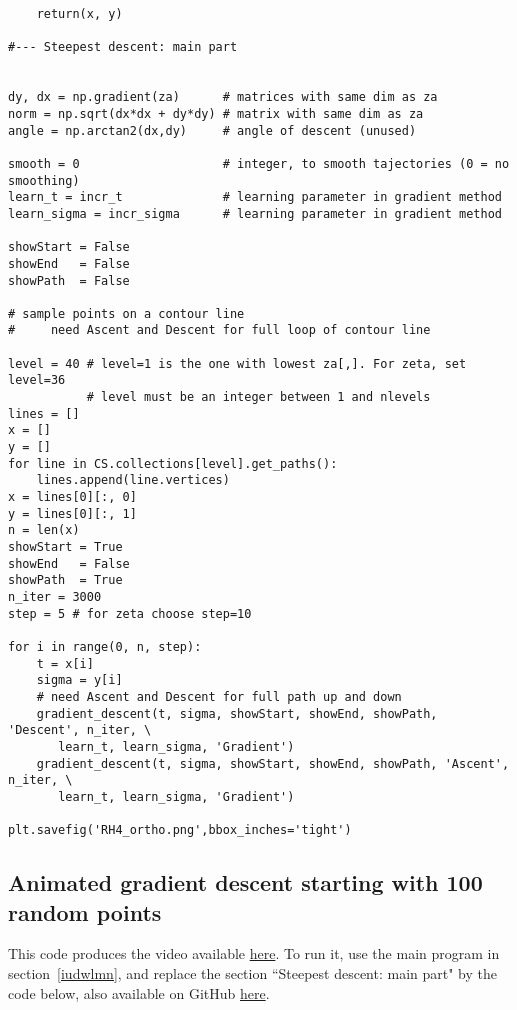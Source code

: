 \documentclass[oneside,10pt]{book}
\begin{document}
\begin{lstlisting}
    return(x, y)  

#--- Steepest descent: main part 


dy, dx = np.gradient(za)      # matrices with same dim as za 
norm = np.sqrt(dx*dx + dy*dy) # matrix with same dim as za
angle = np.arctan2(dx,dy)     # angle of descent (unused)

smooth = 0                    # integer, to smooth tajectories (0 = no smoothing)
learn_t = incr_t              # learning parameter in gradient method  
learn_sigma = incr_sigma      # learning parameter in gradient method 

showStart = False
showEnd   = False
showPath  = False

# sample points on a contour line
#     need Ascent and Descent for full loop of contour line

level = 40 # level=1 is the one with lowest za[,]. For zeta, set level=36 
           # level must be an integer between 1 and nlevels
lines = []  
x = []
y = []
for line in CS.collections[level].get_paths():
    lines.append(line.vertices)
x = lines[0][:, 0]
y = lines[0][:, 1]
n = len(x)
showStart = True
showEnd   = False
showPath  = True
n_iter = 3000 
step = 5 # for zeta choose step=10

for i in range(0, n, step):  
    t = x[i]
    sigma = y[i]
    # need Ascent and Descent for full path up and down
    gradient_descent(t, sigma, showStart, showEnd, showPath, 'Descent', n_iter, \
       learn_t, learn_sigma, 'Gradient')
    gradient_descent(t, sigma, showStart, showEnd, showPath, 'Ascent', n_iter, \
       learn_t, learn_sigma, 'Gradient')

plt.savefig('RH4_ortho.png',bbox_inches='tight')
\end{lstlisting}

\subsection{Animated gradient descent starting with 100 random points}\label{p100}

This code produces the video available \href{https://www.youtube.com/watch?v=pqQsLpPkvbw}{here}. To run it, use the main program in section~\ref{iudwlmn}, and replace the section
``Steepest descent: main part" by the code below, also available on GitHub \href{https://github.com/VincentGranville/Experimental-Math-Number-Theory/blob/main/Source-Code/gradient_animated.py}{here}.\vspace{1ex}
\end{document}
